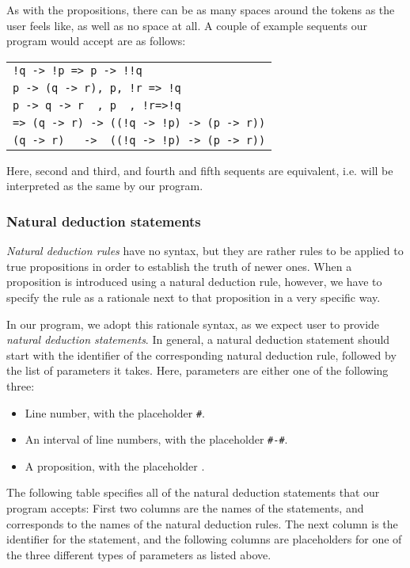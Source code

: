 \documentclass{article}
\begin{document}
As with the propositions, there can be as many spaces around the tokens as
the user feels like, as well as no space at all. A couple of example sequents
our program would accept are as follows:

\begin{center}
	\begin{tabular}{l}
		\verb^!q -> !p => p -> !!q^\\
		\verb^p -> (q -> r), p, !r => !q^\\
		\verb^p -> q -> r  , p  , !r=>!q^\\
		\verb^=> (q -> r) -> ((!q -> !p) -> (p -> r))^\\
		\verb^(q -> r)   ->  ((!q -> !p) -> (p -> r))^
	\end{tabular}
\end{center}

Here, second and third, and fourth and fifth sequents are equivalent, i.e.
will be interpreted as the same by our program.

\subsubsection{Natural deduction statements}

\textit{Natural deduction rules} have no syntax, but they are rather rules to be
applied to true propositions in order to establish the truth of newer ones. When a
proposition is introduced using a natural deduction rule, however, we have to
specify the rule as a rationale next to that proposition in a very specific way.

\newcommand{\AN}{\texttt{\#}}
\newcommand{\AR}{\texttt{\#-\#}}
\newcommand{\AF}{\texttt{\textphi}}

In our program, we adopt this rationale syntax, as we expect user to provide
\textit{natural deduction statements}. In general, a natural deduction statement
should start with the identifier of the corresponding natural deduction rule,
followed by the list of parameters it takes. Here, parameters are either one of
the following three:
\begin{itemize}
	\item Line number, with the placeholder \AN.
	\item An interval of line numbers, with the placeholder \AR.
	\item A proposition, with the placeholder \AF.
\end{itemize}

The following table specifies all of the natural deduction statements that our
program accepts: First two columns are the names of the statements, and corresponds
to the names of the natural deduction rules. The next column is the identifier for
the statement, and the following columns are placeholders for one of the three
different types of parameters as listed above.
\end{document}
